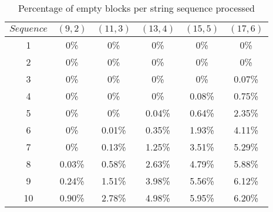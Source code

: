 \begin{table}[h] %
	\renewcommand{\arraystretch}{1.3}
	\centering
	\begin{tabular}{|c|c|c|c|c|c|}
		\hline 
		\bfseries\boldmath $Sequence$ & 
		\bfseries\boldmath $(9,2)$ & 
		\bfseries\boldmath $(11,3)$ & 
		\bfseries\boldmath $(13,4)$ & 
		\bfseries\boldmath $(15,5)$ & 
		\bfseries\boldmath $(17,6)$ \\
		\hline
			1	& 	0\%		& 	0\%		& 	0\%		&	0\%		& 	0\%\\
			2	& 	0\%		& 	0\%		& 	0\%		&	0\% 	& 	0\%\\
			3	& 	0\%		& 	0\%		& 	0\%		&	0\% 	& 	0.07\%\\
			4	& 	0\%		& 	0\%		& 	0\% 	&	0.08\% 	& 	0.75\%\\
			5	& 	0\%		& 	0\% 	&	0.04\%	&	0.64\%	&	2.35\%\\
			6	& 	0\%		& 	0.01\%	& 	0.35\%	&	1.93\%	&	4.11\%\\
			7	& 	0\%		& 	0.13\%	& 	1.25\%	&	3.51\%	&	5.29\%\\
			8	& 	0.03\% 	&	0.58\%	& 	2.63\%	&	4.79\%	&	5.88\%\\
			9	& 	0.24\% 	& 	1.51\%	& 	3.98\%	&	5.56\%	&	6.12\%\\
			10	& 	0.90\% 	&	2.78\%	& 	4.98\%	&	5.95\%	&	6.20\%\\
		\hline\end{tabular}
		
		\caption{Percentage of empty blocks per string sequence processed}
		\label{tbl:empty_blocks}
\end{table}